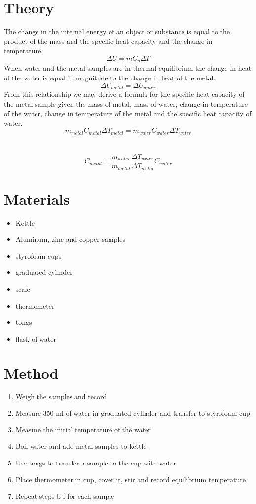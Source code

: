 \documentclass{article}
\begin{document}
\section{Theory}
The change in the internal energy of an object or substance is equal to the product of the mass and the specific heat capacity and the change in temperature.
$$\Delta U=mC_p\Delta T$$
When water and the metal samples are in thermal equilibrium the change in heat of the water is equal in magnitude to the change in heat of the metal.
$$\Delta U_{metal}=\Delta U_{water}$$
From this relationship we may derive a formula for the specific heat capacity of the metal sample given the mass of metal, mass of water, change in temperature of the water, change in temperature of the metal and the specific heat capacity of water.
$$m_{metal}C_{metal}\Delta T_{metal}=m_{water}C_{water}\Delta T_{water}$$\\
\\
$$C_{metal}=\frac{m_{water}}{m_{metal}}  \frac{\Delta T_{water}}{\Delta T_{metal}}    C_{water}$$

\newpage

\section{Materials}
\begin{itemize}
\item Kettle 
\item Aluminum, zinc and copper samples
\item styrofoam cups
\item graduated cylinder
\item scale
\item thermometer
\item tongs
\item flask of water
\end{itemize}

\section{Method}

\begin{enumerate}
\item Weigh the samples and record
\item Measure 350 ml of water in graduated cylinder and transfer to styrofoam cup
\item Measure the initial temperature of the water
\item Boil water and add metal samples to kettle
\item Use tongs to transfer a sample to the cup with water
\item Place thermometer in cup, cover it, stir and record equilibrium temperature
\item Repeat steps b-f for each sample

\end{enumerate}
\end{document}
